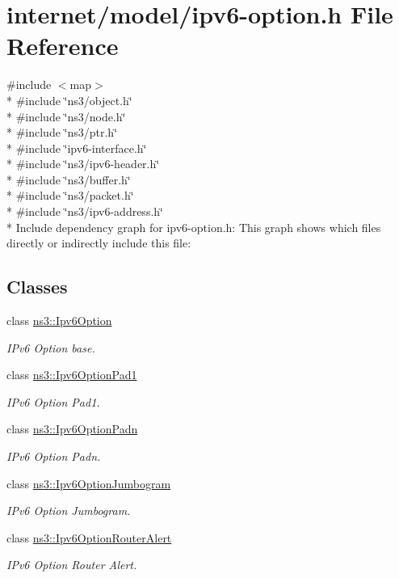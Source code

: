\hypertarget{ipv6-option_8h}{}\section{internet/model/ipv6-\/option.h File Reference}
\label{ipv6-option_8h}
{\ttfamily \#include $<$map$>$}\\*
{\ttfamily \#include \char`\"{}ns3/object.\+h\char`\"{}}\\*
{\ttfamily \#include \char`\"{}ns3/node.\+h\char`\"{}}\\*
{\ttfamily \#include \char`\"{}ns3/ptr.\+h\char`\"{}}\\*
{\ttfamily \#include \char`\"{}ipv6-\/interface.\+h\char`\"{}}\\*
{\ttfamily \#include \char`\"{}ns3/ipv6-\/header.\+h\char`\"{}}\\*
{\ttfamily \#include \char`\"{}ns3/buffer.\+h\char`\"{}}\\*
{\ttfamily \#include \char`\"{}ns3/packet.\+h\char`\"{}}\\*
{\ttfamily \#include \char`\"{}ns3/ipv6-\/address.\+h\char`\"{}}\\*
Include dependency graph for ipv6-\/option.h\+:
This graph shows which files directly or indirectly include this file\+:
\subsection*{Classes}
\begin{DoxyCompactItemize}
\item 
class \hyperlink{classns3_1_1Ipv6Option}{ns3\+::\+Ipv6\+Option}
\begin{DoxyCompactList}\small\item\em I\+Pv6 Option base. \end{DoxyCompactList}\item 
class \hyperlink{classns3_1_1Ipv6OptionPad1}{ns3\+::\+Ipv6\+Option\+Pad1}
\begin{DoxyCompactList}\small\item\em I\+Pv6 Option Pad1. \end{DoxyCompactList}\item 
class \hyperlink{classns3_1_1Ipv6OptionPadn}{ns3\+::\+Ipv6\+Option\+Padn}
\begin{DoxyCompactList}\small\item\em I\+Pv6 Option Padn. \end{DoxyCompactList}\item 
class \hyperlink{classns3_1_1Ipv6OptionJumbogram}{ns3\+::\+Ipv6\+Option\+Jumbogram}
\begin{DoxyCompactList}\small\item\em I\+Pv6 Option Jumbogram. \end{DoxyCompactList}\item 
class \hyperlink{classns3_1_1Ipv6OptionRouterAlert}{ns3\+::\+Ipv6\+Option\+Router\+Alert}
\begin{DoxyCompactList}\small\item\em I\+Pv6 Option Router Alert. \end{DoxyCompactList}\end{DoxyCompactItemize}
